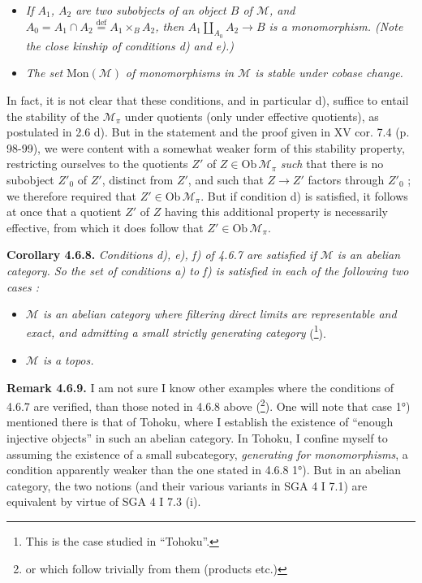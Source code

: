\documentclass[11pt]{article}
\newcommand{\printedpage}[1]{\marginpar{\footnotesize p.~#1}}
\newcommand{\msp}[1]{\marginpar{\footnotesize [#1]}}
\newcommand{\Mc}{\mathcal{M}}
\begin{document}
\begin{itemize}[leftmargin=4em]
\item[\textit{e)}] \textit{If $A_1$, $A_2$ are two subobjects of an object $B$ of $\Mc$, and $A_0 = A_1 \cap A_2 \overset{\text{def}}{=} A_1 \times_B A_2$, then $A_1 \amalg_{A_0} A_2 \longrightarrow B$ is a monomorphism. (Note the close kinship of conditions d) and e).)}
\item[\textit{f)}] \textit{The set} $\mathrm{Mon}(\Mc)$ \textit{of monomorphisms in $\Mc$ is stable under cobase change.}
\end{itemize}
In fact, it is not clear that these conditions, and in particular d), suffice to entail the stability of the $\Mc_{\pi}$ under quotients (only under effective quotients), as postulated in 2.6 d). But in the statement and the proof given in XV cor. 7.4 (p. 98-99), we were content with a somewhat weaker form of this stability property, restricting ourselves to the quotients $Z'$ of $Z \in \mathrm{Ob}\,\Mc_{\pi}$ \textit{such} that there is no subobject $Z'_0$ of $Z'$, distinct from $Z'$, and such that $Z \longrightarrow Z'$ factors through $Z'_0$ ; we therefore required that $Z' \in \mathrm{Ob}\,\Mc_{\pi}$. But if condition d) is satisfied, it follows at once that a quotient $Z'$ of $Z$ having this additional property is necessarily effective, from which it does follow that $Z' \in \mathrm{Ob}\,\Mc_{\pi}$.

\printedpage{52}
\msp{page 159}

\textbf{Corollary 4.6.8.} \textit{Conditions d), e), f) of 4.6.7 are satisfied if $\Mc$ is an abelian category. So the set of conditions a) to f) is satisfied in each of the following two cases :}
\begin{itemize}[leftmargin=4em]
\item[\textit{1)}] \textit{$\Mc$ is an abelian category where filtering direct limits are representable and exact, and admitting a small strictly generating category} (\footnote[63]{This is the case studied in ``Tohoku''.}).
\item[\textit{2)}] \textit{$\Mc$ is a topos.}
\end{itemize}
\textbf{Remark 4.6.9.} I am not sure I know other examples where the conditions of 4.6.7 are verified, than those noted in 4.6.8 above (\footnote[64]{or which follow trivially from them (products etc.)}). One will note that case 1°) mentioned there is that of Tohoku, where I establish the existence of ``enough injective objects'' in such an abelian category. In Tohoku, I confine myself to assuming the existence of a small subcategory, \textit{generating for monomorphisms}, a condition apparently weaker than the one stated in 4.6.8 1°). But in an abelian category, the two notions (and their various variants in SGA 4 I 7.1) are equivalent by virtue of SGA 4 I 7.3 (i). %
\end{document}
